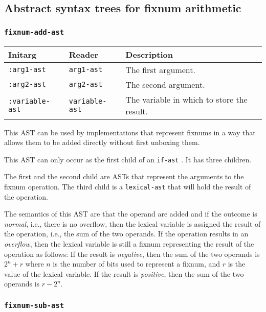 \subsection{Abstract syntax trees for fixnum arithmetic}

\subsubsection{\texttt{fixnum-add-ast}}
\label{fixnum-add-ast}

\begin{tabular}{|l|l|l|}
\hline
Initarg & Reader & Description\\
\hline\hline
\texttt{:arg1-ast} & \texttt{arg1-ast} & The first argument.\\
\hline
\texttt{:arg2-ast} & \texttt{arg2-ast} & The second argument.\\
\hline
\texttt{:variable-ast} & \texttt{variable-ast} & The variable in which to store the result.\\
\hline
\end{tabular}

This AST can be used by implementations that represent fixnums in a
way that allows them to be added directly without first unboxing
them.  

This AST can only occur as the first child of an \texttt{if-ast}
.  It has three children.

The first and the second child are ASTs that represent the arguments
to the fixnum operation.  The third child is a
\texttt{lexical-ast} that will hold the result of the operation.

The semantics of this AST are that the operand are added and if the
outcome is \emph{normal}, i.e., there is no overflow, then the lexical
variable is assigned the result of the operation, i.e., the sum of the
two operands.  If the operation results in an \emph{overflow}, then
the lexical variable is still a fixnum representing the result of the
operation as follows:  If the result is \emph{negative}, then the
sum of the two operands is $2^n + r$ where $n$ is the number of bits
used to represent a fixnum, and $r$ is the value of the lexical
variable.  If the result is \emph{positive}, then the sum of the two
operands is $r - 2^n$.

\subsubsection{\texttt{fixnum-sub-ast}}
\label{fixnum-sub-ast}

